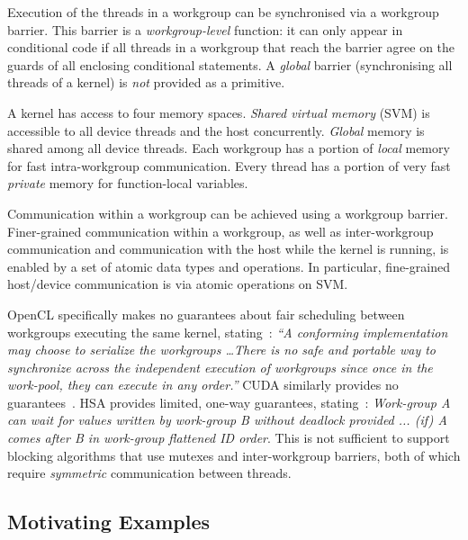\documentclass[parskip=half,sigconf,review, anonymous=true, acmcopyrightmode=none]{acmart}
\begin{document}
Execution of the threads in a workgroup can be synchronised via a
workgroup barrier. This barrier is a \emph{workgroup-level} function:
it can only appear in conditional code if all threads in a workgroup
that reach the barrier agree on the guards of all enclosing
conditional statements.  A \emph{global} barrier (synchronising all
threads of a kernel) is \emph{not} provided as a primitive.

 A kernel has access to
four memory spaces.  \emph{Shared virtual memory} (SVM) is accessible
to all device threads and the host concurrently.  \emph{Global} memory is
shared among all device threads.  Each workgroup has a
portion of \emph{local} memory for fast intra-workgroup communication.
Every thread has a portion of very fast \emph{private} memory for
function-local variables.

Communication within a workgroup can be achieved
using a workgroup barrier.  Finer-grained
communication within a workgroup, as well as inter-workgroup
communication and communication with the host while the kernel is
running, is enabled by a set of atomic data types and operations.  In
particular, fine-grained host/device communication is via atomic
operations on SVM.

OpenCL specifically makes no guarantees about fair scheduling between
workgroups executing the same kernel, stating~\cite[p.\ 31]{opencl2Spec}: \emph{``A
  conforming implementation may choose to serialize the workgroups 
\dots There is no safe and portable way to synchronize across
  the independent execution of workgroups since once in the work-pool,
  they can execute in any order.''}  CUDA similarly provides no guarantees~\cite{cuda-75}.
%
HSA provides limited, one-way guarantees,
stating~\cite[p. 46]{HSAprogramming11}: \emph{Work-group A can wait
  for values written by work-group B without deadlock provided ... (if) A
  comes after B in work-group flattened ID order}. This is not sufficient to support blocking algorithms that use
mutexes and inter-workgroup barriers, both of which require \emph{symmetric} communication between
threads.


\subsection{Motivating Examples}\label{sec:openclexamples}
\end{document}

